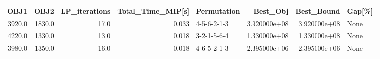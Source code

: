 \begin{tabular}{rrrrlrrl}
\toprule
   OBJ1 &    OBJ2 &  LP\_iterations &  Total\_Time\_MIP[s] &  Permutation &      Best\_Obj &    Best\_Bound & Gap[\%] \\
\midrule
 3920.0 &  1830.0 &           17.0 &              0.033 &  4-5-6-2-1-3 &  3.920000e+08 &  3.920000e+08 &   None \\
 4220.0 &  1330.0 &           13.0 &              0.018 &  3-2-1-5-6-4 &  1.330000e+08 &  1.330000e+08 &   None \\
 3980.0 &  1350.0 &           16.0 &              0.018 &  4-6-5-2-1-3 &  2.395000e+06 &  2.395000e+06 &   None \\
\bottomrule
\end{tabular}
